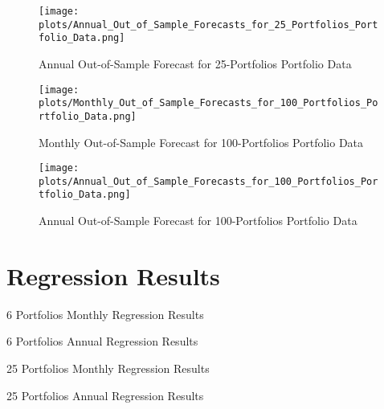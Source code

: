 \documentclass[12pt]{article}
\begin{document}
\begin{figure}[h]
    \centering
    \texttt{[image: plots/Annual\_Out\_of\_Sample\_Forecasts\_for\_25\_Portfolios\_Portfolio\_Data.png]}
    \caption{Annual Out-of-Sample Forecast for 25-Portfolios Portfolio Data}
    \label{fig:forecast_25_annual}
\end{figure}

\begin{figure}[h]
    \centering
    \texttt{[image: plots/Monthly\_Out\_of\_Sample\_Forecasts\_for\_100\_Portfolios\_Portfolio\_Data.png]}
    \caption{Monthly Out-of-Sample Forecast for 100-Portfolios Portfolio Data}
    \label{fig:forecast_100_monthly}
\end{figure}

\begin{figure}[h]
    \centering
    \texttt{[image: plots/Annual\_Out\_of\_Sample\_Forecasts\_for\_100\_Portfolios\_Portfolio\_Data.png]}
    \caption{Annual Out-of-Sample Forecast for 100-Portfolios Portfolio Data}
    \label{fig:forecast_100_annual}
\end{figure}


\doublespacing
\section{Regression Results}

\begin{table}[ht]
    \centering
    \caption{6 Portfolios Monthly Regression Results}
    
\end{table}

\begin{table}[ht]
    \centering
    \caption{6 Portfolios Annual Regression Results}
    
\end{table}

\begin{table}[ht]
    \centering
    \caption{25 Portfolios Monthly Regression Results}
    
\end{table}

\begin{table}[ht]
    \centering
    \caption{25 Portfolios Annual Regression Results}
    
\end{table}
\end{document}
